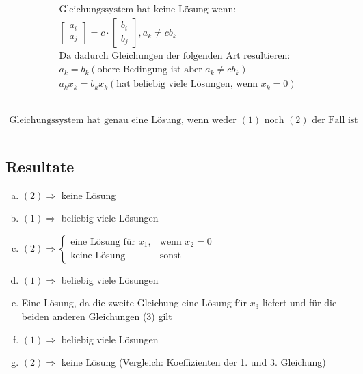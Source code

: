 \documentclass{article}
\begin{document}
    \begin{equation}
        \begin{gathered}
            \\
            \text{Gleichungssystem hat keine Lösung wenn: } \\
            \begin{bmatrix} a_i \\ a_j \end{bmatrix}
            = c \cdot \begin{bmatrix} b_i \\ b_j \end{bmatrix}, 
            a_k \neq cb_k \\
            \text{Da dadurch Gleichungen der folgenden Art resultieren: } \\
            a_k = b_k (\text{obere Bedingung ist aber }  a_k \neq cb_k) \\
            a_k x_k = b_k x_k (\text{hat beliebig viele Lösungen, wenn } x_k=0)\\
            \\
        \end{gathered}
    \end{equation}

    \begin{equation}
        \begin{gathered}
            \\
            \text{Gleichungssystem hat genau eine Lösung, wenn weder } (1) \text{ noch } (2) \text{ der Fall ist}
            \\ \\
        \end{gathered}
    \end{equation}

    \newpage

    \subsection{Resultate}

    \begin{enumerate}[(a)]
    \item $(2) \Rightarrow $ keine Lösung
    \item $(1) \Rightarrow $ beliebig viele Lösungen
    \item $(2) \Rightarrow \begin{cases} \text{eine Lösung für }x_1,& \text{wenn } x_2=0 \\ \text{keine Lösung }& \text{sonst} \end{cases}$ 
    \item $(1) \Rightarrow $ beliebig viele Lösungen
    \item Eine Lösung, da die zweite Gleichung eine Lösung für $x_3$ liefert und für die beiden anderen Gleichungen (3) gilt
    \item $(1) \Rightarrow $ beliebig viele Lösungen
    \item $(2) \Rightarrow $ keine Lösung (Vergleich: Koeffizienten der 1. und 3. Gleichung)
    \end{enumerate}
\end{document}
